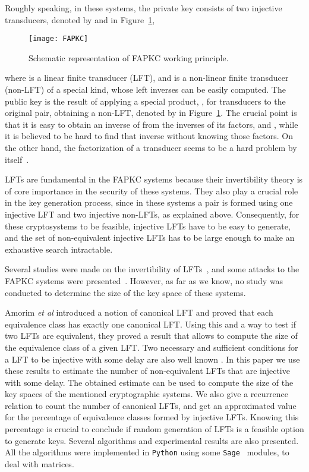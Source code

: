 \documentclass{ocg}
\newcommand{\LFT}{LFT}
\begin{document}
Roughly speaking, in these systems, the private key consists of two
injective transducers, denoted by  and  in Figure~\ref{fig1},
\begin{figure}[t]
  \begin{center}
  \texttt{[image: FAPKC]}
  \end{center}
  \caption{Schematic representation of FAPKC working principle.}
  \label{fig1}
\end{figure}
where  is a linear finite transducer (\LFT), and  is a
non-linear finite transducer (non-\LFT{}) of a special kind, whose
left inverses can be easily computed. The public key is the result of
applying a special product, , for transducers to the
original pair, obtaining a non-\LFT{}, denoted by
 in Figure~\ref{fig1}. The crucial point is that it
is easy to obtain an inverse of  from the inverses
of its factors,  and , while it is believed to be hard
to find that inverse without knowing those factors.  On the other
hand, the factorization of a transducer seems to be a hard problem by
itself~\cite{Zongduo1998}.

\LFT{}s are fundamental in the FAPKC systems because their invertibility theory is of core importance in the security of these systems.
 They also play a crucial role in the key generation process, since in these systems a
pair  is formed using one injective \LFT{} and
two injective non-\LFT{}s, as explained above. Consequently, for these
cryptosystems to be feasible, injective \LFT{}s have to be easy to
generate, and the set of non-equivalent injective \LFT{}s has to be
large enough to make an exhaustive search intractable.

Several studies were made on the invertibility of \LFT{}s~\cite{Tao1973,Tao1988,Zongduo1996,Zongduo1998,Zongduo1999,ITA:9218509},
and some attacks to the FAPKC systems were presented~\cite{BaoIgarashi1995,Zongduo1996,TaoBook}.  However, as far
as we know, no study was conducted to determine the size of the key
space of these systems. 

Amorim \textit{et al} \cite{AMRciaa14} introduced a notion of
canonical \LFT{} and proved that each equivalence class has exactly
one canonical \LFT{}. Using this and a way to test if two \LFT{}s are
equivalent, they proved a result that allows to compute the size of
the equivalence class of a given \LFT{}. Two necessary and
sufficient conditions for a \LFT{} to be injective with some delay
 are also well known \cite[Theorem 3.4]{ITA:9218509}. In this
paper we use these results to estimate the number of non-equivalent
\LFT{}s that are injective with some delay. The obtained estimate can
be used to compute the size of the key spaces of the mentioned
cryptographic systems. We also give a recurrence relation to count the
number of canonical \LFT{}s, and get an approximated value for the
percentage of equivalence classes formed by injective \LFT{}s. Knowing
this percentage is crucial to conclude if random generation of \LFT{}s
is a feasible option to generate keys. Several algorithms and
experimental results are also presented. All the algorithms were
implemented in \texttt{Python} using some 
\texttt{Sage}~\cite{sage} modules, to deal with matrices.
\end{document}
